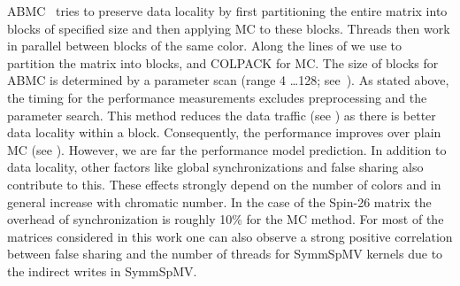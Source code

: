 \Acrshort{ABMC}~\cite{ABMC} tries to preserve data locality by first partitioning
the entire matrix into blocks of specified size and then
applying \acrshort{MC} to these blocks. Threads then work in parallel
between blocks of the same color. Along the lines of \cite{Park_HPCG} 
we use \METIS \cite{METIS} to partition the matrix into blocks, and COLPACK 
for \acrshort{MC}. The size of blocks for \acrshort{ABMC} is
determined by a parameter scan (range 4 \ldots 128;
see~\cite{ABMC})\@. As stated above, the timing for the performance measurements
excludes preprocessing and the parameter search. This method reduces the 
data traffic (see ) as there is better data
locality within a block. Consequently, the performance improves
over plain \acrshort{MC} (see ). However,
we are far   the performance model prediction. In
addition to data locality, other factors like global synchronizations
and false sharing also contribute to this. These
effects strongly depend on the number of colors and in general
increase with chromatic number. In the case of the Spin-26 matrix the overhead of
synchronization is roughly 10\% for the \acrshort{MC} method.  For most of
the matrices considered in this work one can also observe a strong
positive correlation between false sharing and the number of threads
for \acrshort{SymmSpMV} kernels due to the indirect writes
in \acrshort{SymmSpMV}.
 
 



